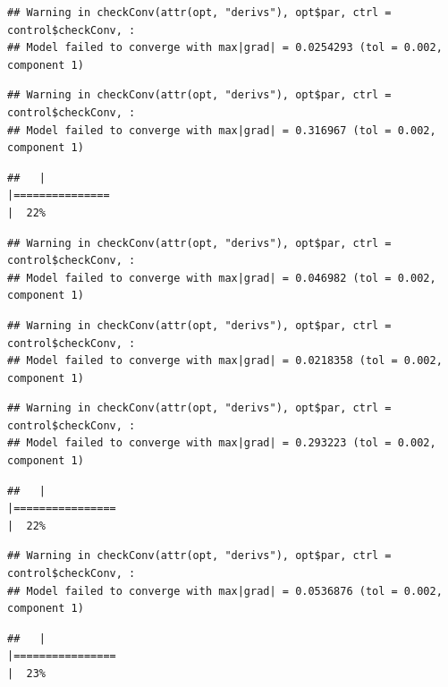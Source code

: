 \documentclass[
  12pt,
]{book}
\begin{document}
\begin{verbatim}
## Warning in checkConv(attr(opt, "derivs"), opt$par, ctrl = control$checkConv, :
## Model failed to converge with max|grad| = 0.0254293 (tol = 0.002, component 1)
\end{verbatim}

\begin{verbatim}
## Warning in checkConv(attr(opt, "derivs"), opt$par, ctrl = control$checkConv, :
## Model failed to converge with max|grad| = 0.316967 (tol = 0.002, component 1)
\end{verbatim}

\begin{verbatim}
##   |                                                                              |===============                                                       |  22%
\end{verbatim}

\begin{verbatim}
## Warning in checkConv(attr(opt, "derivs"), opt$par, ctrl = control$checkConv, :
## Model failed to converge with max|grad| = 0.046982 (tol = 0.002, component 1)
\end{verbatim}

\begin{verbatim}
## Warning in checkConv(attr(opt, "derivs"), opt$par, ctrl = control$checkConv, :
## Model failed to converge with max|grad| = 0.0218358 (tol = 0.002, component 1)
\end{verbatim}

\begin{verbatim}
## Warning in checkConv(attr(opt, "derivs"), opt$par, ctrl = control$checkConv, :
## Model failed to converge with max|grad| = 0.293223 (tol = 0.002, component 1)
\end{verbatim}

\begin{verbatim}
##   |                                                                              |================                                                      |  22%
\end{verbatim}

\begin{verbatim}
## Warning in checkConv(attr(opt, "derivs"), opt$par, ctrl = control$checkConv, :
## Model failed to converge with max|grad| = 0.0536876 (tol = 0.002, component 1)
\end{verbatim}

\begin{verbatim}
##   |                                                                              |================                                                      |  23%
\end{verbatim}
\end{document}
